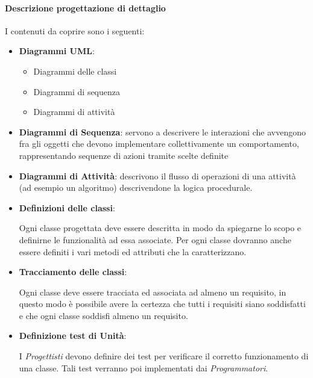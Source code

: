 \paragraph{Descrizione progettazione di dettaglio}

I contenuti da coprire sono i seguenti:

\begin{itemize}
\item \textbf{Diagrammi UML}:
  \begin{itemize}
  \item Diagrammi delle classi
  \item Diagrammi di sequenza
  \item Diagrammi di attività
  \end{itemize}

\item \textbf{Diagrammi di Sequenza}: servono a descrivere le interazioni che avvengono fra gli oggetti che devono implementare collettivamente un comportamento, rappresentando sequenze di azioni tramite scelte definite

\item \textbf{Diagrammi di Attività}:  descrivono il flusso di operazioni di una attività (ad esempio un algoritmo) descrivendone la logica procedurale.



\item \textbf{Definizioni delle classi}:

  Ogni classe progettata deve essere descritta in modo da spiegarne lo
  scopo e definirne le funzionalità ad essa associate. Per ogni classe
  dovranno anche essere definiti i vari metodi ed attributi che la
  caratterizzano. 

\item \textbf{Tracciamento delle classi}:

  Ogni classe deve essere tracciata ed associata ad almeno un
  requisito, in questo modo è possibile avere la certezza che tutti i
  requisiti siano soddisfatti e che ogni classe soddisfi almeno un
  requisito.

\item \textbf{Definizione test di Unità}:

I \textit{Progettisti} devono definire dei test per verificare il corretto funzionamento di una classe.
Tali test verranno poi implementati dai \textit{Programmatori}.

\end{itemize}

